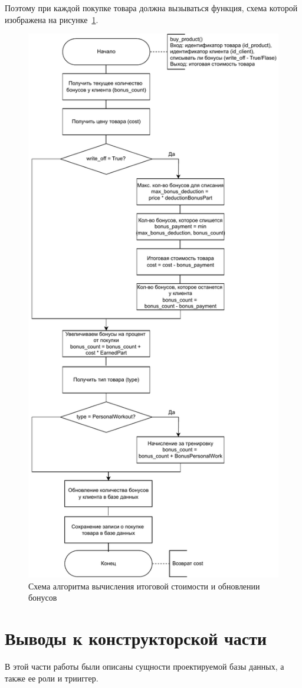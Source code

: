 Поэтому при каждой покупке товара должна вызываться функция, схема которой изображена на рисунке~\ref{fig:trigger}.
\clearpage
\begin{figure}[h!]
	\centering
	\includegraphics[width=0.65\linewidth]{img/trigger}
	\caption{Схема алгоритма вычисления итоговой стоимости и обновлении бонусов}
	\label{fig:trigger}
\end{figure}
\clearpage


\section*{Выводы к конструкторской части}

В этой части работы были описаны сущности проектируемой базы данных, а также ее роли и трииггер.